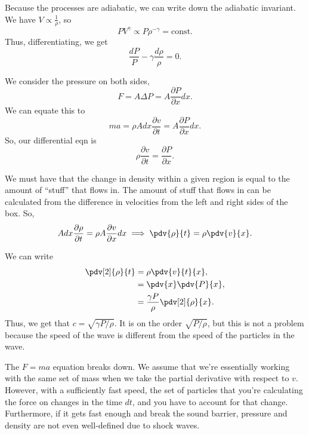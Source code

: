 \documentclass[11pt]{scrartcl}
\begin{document}
\begin{alphasol}
    \item Because the processes are adiabatic, we can write down the adiabatic invariant. We have $V \propto \frac{1}{\rho}$, so
    $$PV^\gamma \propto P\rho^{-\gamma} = \text{const.}$$
    Thus, differentiating, we get
    $$\frac{dP}{P} - \gamma \frac{d\rho}{\rho} = 0.$$
    \item We consider the pressure on both sides,
    $$F = A\Delta P = A\frac{\partial P}{\partial x} dx.$$
    We can equate this to
    $$ma = \rho A dx \frac{\partial v}{\partial t} = A \frac{\partial P}{\partial x} dx.$$
    So, our differential eqn is
    $$\rho \frac{\partial v}{\partial t} = \frac{\partial P}{\partial x}.$$
    \item We must have that the change in density within a given region is equal to the amount of ``stuff'' that flows in. The amount of stuff that flows in can be calculated from the difference in velocities from the left and right sides of the box. So,
    $$A dx \frac{\partial \rho}{\partial t} = \rho A \frac{\partial v}{\partial x} dx \implies \pdv{\rho}{t} = \rho \pdv{v}{x}.$$
    \item We can write 
    \begin{align*}
        \pdv[2]{\rho}{t} &= \rho \pdv{v}{t}{x},\\
        &= \pdv{x}\pdv{P}{x},\\
        &= \frac{\gamma P}{\rho} \pdv[2]{\rho}{x}.
    \end{align*}
    Thus, we get that $c= \sqrt{\gamma P/\rho}$. It is on the order $\sqrt{P/\rho}$, but this is not a problem because the speed of the wave is different from the speed of the particles in the wave.
    \item The $F=ma$ equation breaks down. We assume that we're essentially working with the same set of mass when we take the partial derivative with respect to $v$. However, with a sufficiently fast speed, the set of particles that you're calculating the force on changes in the time $dt$, and you have to account for that change. Furthermore, if it gets fast enough and break the sound barrier, pressure and density are not even well-defined due to shock waves.
\end{alphasol}
\end{document}
